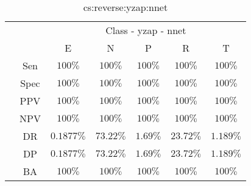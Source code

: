 \begin{table}[!ht]
	\centering
	\begin{tabular}{|c|c|c|c|c|c|c|}
		\cline{3-7}
		\multicolumn{2}{c|}{} & \multicolumn{5}{c|}{Class - yzap - nnet} \\ \cline{3-7}
		\multicolumn{2}{c|}{} & E & N & P & R & T \\ \hline
		\multirow{7}{*}{\rotatebox{90}{Statistics}} & Sen & $100\%$ & $100\%$ & $100\%$ & $100\%$ & $100\%$ \\ \cline{2-7}
		 & Spec & $100\%$ & $100\%$ & $100\%$ & $100\%$ & $100\%$ \\ \cline{2-7}
		 & PPV & $100\%$ & $100\%$ & $100\%$ & $100\%$ & $100\%$ \\ \cline{2-7}
		 & NPV & $100\%$ & $100\%$ & $100\%$ & $100\%$ & $100\%$ \\ \cline{2-7}
		 & DR & $0.1877\%$ & $73.22\%$ & $1.69\%$ & $23.72\%$ & $1.189\%$ \\ \cline{2-7}
		 & DP & $0.1877\%$ & $73.22\%$ & $1.69\%$ & $23.72\%$ & $1.189\%$ \\ \cline{2-7}
		 & BA & $100\%$ & $100\%$ & $100\%$ & $100\%$ & $100\%$ \\ \hline
	\end{tabular}
	\caption{cs:reverse:yzap:nnet}
	\label{tab:cs:reverse:yzap:nnet}
\end{table}
